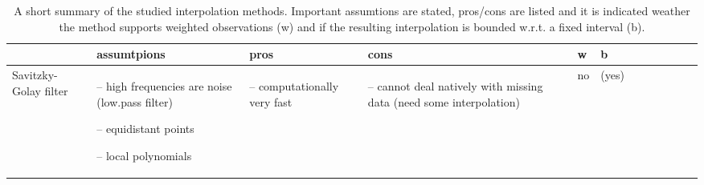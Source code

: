 \begin{table}[!ht]
	\centering
	\caption[skip=10pt]{A short summary of the studied interpolation methods. Important assumtions are stated, pros/cons are listed and it is indicated weather the method supports weighted observations (w) and if the resulting interpolation is bounded w.r.t. a fixed interval (b).}
	\small
	\begin{tabular}{p{1.6cm}p{3.3cm}p{3.3cm}p{3.4cm}p{0.4cm}p{0.4cm}p{3cm}p{3cm}p{3cm}p{3cm}p{3cm}p{3cm}|}
		\toprule
		~                                                                                                                                                            &
		\textbf{assumtpions}                                                                                                                                         &
		\textbf{pros}                                                                                                                                                &
		\textbf{cons}                                                                                                                                                &
		\textbf{w}                                                                                                                                      &
		\textbf{b}                                                                                                                                        \\ \hline

		Savitzky-Golay filter                                                                                                                                        &
		\begin{cptitemize}
			\item[--] high frequencies are noise (low.pass filter) \item[--] equidistant points \item[--] local polynomials
		\end{cptitemize}                                              &
		\begin{cptitemize} \item[--]  computationally very fast                                                                   \end{cptitemize}                   &
		\begin{cptitemize} \item[--]  cannot deal natively with missing data (need some interpolation)                              \end{cptitemize}                 &
		no                                                                                                                                                           &
		(yes)                                                                                                                                                         \\ \hline%


\end{tabular}
\end{table}
